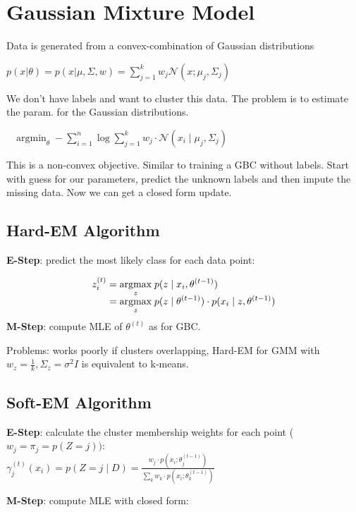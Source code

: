 \section*{Gaussian Mixture Model}

Data is generated from a convex-combination of Gaussian distributions

$p(x  | \theta) = p(x  | \mu, \Sigma, w) = \sum_{j=1}^k w_j \mathcal{N}(x; \mu_j, \Sigma_j)$

We don't have labels and want to cluster this data. The problem is to estimate the param. for the Gaussian distributions.

\ \ $\text{argmin}_{\theta} \; - \sum_{i=1}^n \log \sum_{j=1}^k w_j \cdot \mathcal{N}(x_i \; | \; \mu_j, \Sigma_j)$

This is a non-convex objective. Similar to training a GBC without labels. Start with guess for our parameters, predict the unknown labels and then impute the missing data. Now we can get a closed form update.

\subsection*{Hard-EM Algorithm}

\textbf{E-Step}: predict the most likely class for each data point:

\begin{align*}
	z_i^{(t)} &= \underset{z}{\text{argmax}} \; p(z \; | \; x_i, \theta^{(t-1)}) \\[-5pt]
	&= \underset{z}{\text{argmax}} \; p(z \; | \; \theta^{(t-1)}) \cdot p(x_i \; | \; z, \theta^{(t-1)})
\end{align*}
\textbf{M-Step}: compute MLE of $\theta^{(t)}$ as for GBC. \smallskip

Problems: works poorly if clusters overlapping, Hard-EM for GMM with $w_z=\frac{1}{k}, \Sigma_z=\sigma^2{I}$ is equivalent to k-means.

\subsection*{Soft-EM Algorithm}

\textbf{E-Step}: calculate the cluster membership weights for each point ($w_j = \pi_j = p(Z = j))$: \\[-8pt]

\quad $\gamma_j^{(t)}(x_i) = p(Z = j \; | \; D) =\frac{w_j \cdot p(x_i ; \theta_j^{(t-1)})}{\sum_k w_k \cdot p(x_i ; \theta_k^{(t-1)})}$
		
\textbf{M-Step}: compute MLE with closed form:

